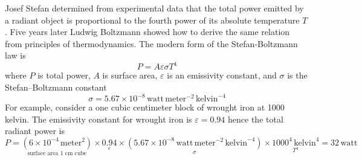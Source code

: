 \documentclass[12pt]{article}
\begin{document}
\noindent
Josef Stefan determined from experimental data that the total power
emitted by a radiant object is proportional
to the fourth power of its absolute temperature $T$.
Five years later Ludwig Boltzmann showed how to derive the same relation from principles of thermodynamics.
The modern form of the Stefan-Boltzmann law is
$$
P=A\varepsilon\sigma T^4
$$
where $P$ is total power, $A$ is surface area, $\varepsilon$ is an emissivity constant,
and $\sigma$ is the Stefan--Boltzmann constant
$$
\sigma=5.67\times10^{-8}\,\text{watt}\,\text{meter}^{-2}\,\text{kelvin}^{-4}
$$
For example, consider a one cubic centimeter block of wrought iron at 1000 kelvin.
The emissivity constant for wrought iron is $\varepsilon=0.94$
hence the total radiant power is
\begin{equation*}
P=
\underset{\text{surface area 1 cm cube}}
{(6\times10^{-4}\,\text{meter}^2)}
\times
\underset{\varepsilon}
{0.94}
\times
\underset{\sigma}
{(5.67\times10^{-8}\,\text{watt}\,\text{meter}^{-2}\,\text{kelvin}^{-4})}
\times
\underset{T^4}
{1000^4\,\text{kelvin}^4}
=32\,\text{watt}
\end{equation*}
\end{document}

